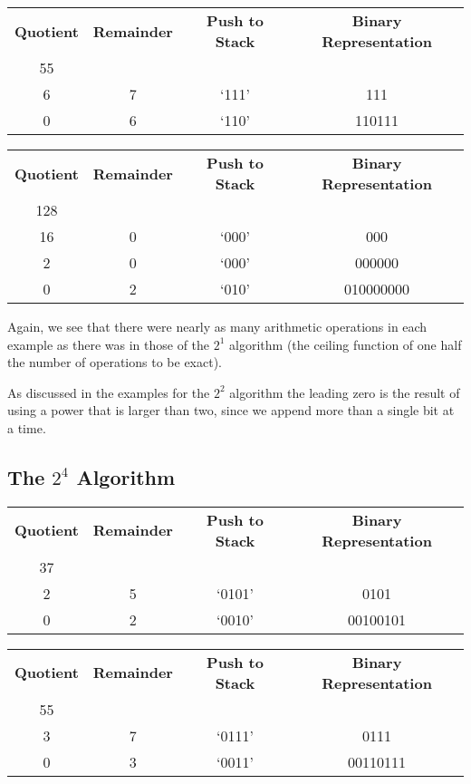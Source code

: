 \documentclass[12pt]{article}
\begin{document}
\begin{center}
  \begin{tabular}{c|c|c|c}
    \textbf{Quotient} & \textbf{Remainder} & \textbf{Push to Stack} & \textbf{Binary Representation} \\
    55 &   &       & \\
    6  & 7 & `111' & 111 \\
    0  & 6 & `110' & 110111
  \end{tabular}
\end{center}

\begin{center}
  \begin{tabular}{c|c|c|c}
    \textbf{Quotient} & \textbf{Remainder} & \textbf{Push to Stack} & \textbf{Binary Representation} \\
    128 &   &       & \\
    16  & 0 & `000' & 000 \\
    2   & 0 & `000' & 000000 \\
    0   & 2 & `010' & 010000000
  \end{tabular}
\end{center}
Again, we see that there were nearly as many arithmetic operations in each example as there was in those of the $2^1$ algorithm (the ceiling function of one half the number of operations to be exact).
\par As discussed in the examples for the $2^2$ algorithm the leading zero is the result of using a power that is larger than two, since we append more than a single bit at a time.

\subsection{The $2^4$ Algorithm}
\begin{center}
  \begin{tabular}{c|c|c|c}
    \textbf{Quotient} & \textbf{Remainder} & \textbf{Push to Stack} & \textbf{Binary Representation} \\
    37 &   &        & \\
    2  & 5 & `0101' & 0101 \\
    0  & 2 & `0010' & 00100101
  \end{tabular}
\end{center}

\begin{center}
  \begin{tabular}{c|c|c|c}
    \textbf{Quotient} & \textbf{Remainder} & \textbf{Push to Stack} & \textbf{Binary Representation} \\
    55 &   &        & \\
    3  & 7 & `0111' & 0111 \\
    0  & 3 & `0011' & 00110111
  \end{tabular}
\end{center}
\end{document}
